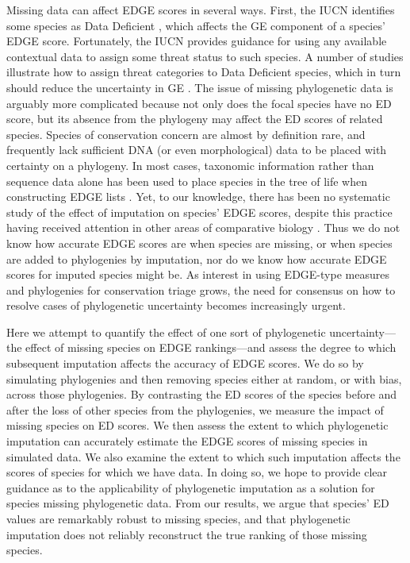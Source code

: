 \documentclass[10pt,english]{article}
\begin{document}
Missing data can affect EDGE scores in several ways. First, the IUCN identifies
some species as Data Deficient \autocite{Iucn2001, Iucn2008}, which affects the
GE component of a species' EDGE score. Fortunately, the IUCN provides guidance
for using any available contextual data to assign some threat status to such
species. A number of studies illustrate how to assign threat categories to Data
Deficient species, which in turn should reduce the uncertainty in GE
\autocite{Good2006, Butchart2010, Morais2013, Dulvy2014}. The issue of missing
phylogenetic data is arguably more complicated because not only does the focal
species have no ED score, but its absence from the phylogeny may affect the ED
scores of related species. Species of conservation concern are almost by
definition rare, and frequently lack sufficient DNA (or even morphological) data
to be placed with certainty on a phylogeny. In most cases, taxonomic information
rather than sequence data alone has been used to place species in the tree of
life when constructing EDGE lists \autocite[see][]{Isaac2007, Collen2011,
Isaac2012, Jetz2014, Curnick2015, Stein2018, Gumbs2018, Forest2018}. Yet, to our
knowledge, there has been no systematic study of the effect of imputation on
species’ EDGE scores, despite this practice having received attention in other
areas of comparative biology \autocite{Kuhn2011, Thomas2013, Rabosky2015}. Thus
we do not know how accurate EDGE scores are when species are missing, or when
species are added to phylogenies by imputation, nor do we know how accurate EDGE
scores for imputed species might be. As interest in using EDGE-type measures
and phylogenies for conservation triage grows, the need for consensus on how to
resolve cases of phylogenetic uncertainty becomes increasingly urgent. 

Here we attempt to quantify the effect of one sort of phylogenetic
uncertainty---the effect of missing species on EDGE rankings---and assess the
degree to which subsequent imputation affects the accuracy of EDGE scores. We do
so by simulating phylogenies and then removing species either at random, or with
bias, across those phylogenies. By contrasting the ED scores of the species
before and after the loss of other species from the phylogenies, we measure the
impact of missing species on ED scores. We then assess the extent to which
phylogenetic imputation can accurately estimate the EDGE scores of missing
species in simulated data. We also examine the extent to which such imputation
affects the scores of species for which we have data. In doing so, we hope to
provide clear guidance as to the applicability of phylogenetic imputation as a
solution for species missing phylogenetic data. From our results, we argue that
species’ ED values are remarkably robust to missing species, and that
phylogenetic imputation does not reliably reconstruct the true ranking of those
missing species.
\end{document}
